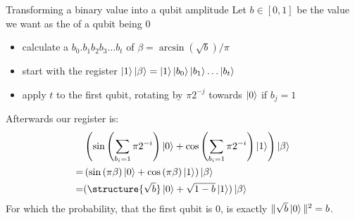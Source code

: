 \documentclass{beamer}
\begin{document}
\frame{\titlepage}










\appendix
\nocite{*}
\frame[allowframebreaks]{\printbibliography}

\begin{frame}{Transforming a binary value into a qubit amplitude}
Let $b\in [0,1]$ be the value we want as the  of a qubit being 0
\begin{itemize}
\item calculate a  $b_0.b_1b_2b_3\ldots b_t$ of $\beta=\arcsin(\sqrt{b})/\pi$
\item start with the register $\ket{1}\ket{\beta}=\ket{1}\ket{b_0}\ket{b_1}\ldots\ket{b_t}$
\item apply $t$  to the first qubit, rotating by $\pi 2^{-j}$ towards $\ket{0}$ if $b_j=1$
\end{itemize}
Afterwards our register is: 
\begin{align*}
&\left(\sin\left(\sum_{b_i=1} \pi 2^{-i}\right)\ket{0}
+\cos\left(\sum_{b_i=1} \pi 2^{-i}\right)\ket{1}\right)
 \ket{\beta}\\
=&\left(\sin\left(\pi\beta\right)\ket{0}
+\cos\left(\pi\beta\right)\ket{1}\right)
 \ket{\beta}\\
=&(\structure{\sqrt{b}}\ket{0}+\sqrt{1-b}\ket{1})\ket{\beta}
\end{align*}
For which the probability, that the first qubit is 0, is exactly $\|\sqrt{b}\ket{0}\|^2=b$.
\end{frame}
\end{document}
